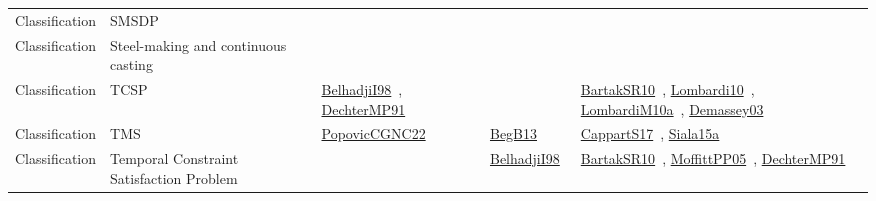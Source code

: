 {\begin{longtable}{lp{3cm}>{\raggedright\arraybackslash}p{6cm}>{\raggedright\arraybackslash}p{6cm}>{\raggedright\arraybackslash}p{8cm}}
Classification & SMSDP &  &  & \\
Classification & Steel-making and continuous casting &  &  & \\
Classification & TCSP & \href{works/BelhadjiI98.pdf}{BelhadjiI98}~\cite{BelhadjiI98}, \href{works/DechterMP91.pdf}{DechterMP91}~\cite{DechterMP91} &  & \href{works/BartakSR10.pdf}{BartakSR10}~\cite{BartakSR10}, \href{works/Lombardi10.pdf}{Lombardi10}~\cite{Lombardi10}, \href{works/LombardiM10a.pdf}{LombardiM10a}~\cite{LombardiM10a}, \href{works/Demassey03.pdf}{Demassey03}~\cite{Demassey03}\\
Classification & TMS & \href{works/PopovicCGNC22.pdf}{PopovicCGNC22}~\cite{PopovicCGNC22} & \href{works/BegB13.pdf}{BegB13}~\cite{BegB13} & \href{works/CappartS17.pdf}{CappartS17}~\cite{CappartS17}, \href{works/Siala15a.pdf}{Siala15a}~\cite{Siala15a}\\
Classification & Temporal Constraint Satisfaction Problem &  & \href{works/BelhadjiI98.pdf}{BelhadjiI98}~\cite{BelhadjiI98} & \href{works/BartakSR10.pdf}{BartakSR10}~\cite{BartakSR10}, \href{works/MoffittPP05.pdf}{MoffittPP05}~\cite{MoffittPP05}, \href{works/DechterMP91.pdf}{DechterMP91}~\cite{DechterMP91}\\

\end{longtable}}
